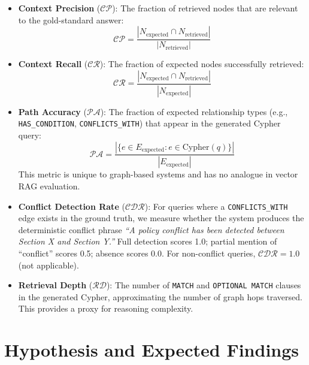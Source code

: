 \begin{itemize}
    \item \textbf{Context Precision} ($\mathcal{CP}$): The fraction of retrieved nodes that are relevant to the gold-standard answer:
    \begin{equation}
        \mathcal{CP} = \frac{|N_{\text{expected}} \cap N_{\text{retrieved}}|}{|N_{\text{retrieved}}|}
    \end{equation}

    \item \textbf{Context Recall} ($\mathcal{CR}$): The fraction of expected nodes successfully retrieved:
    \begin{equation}
        \mathcal{CR} = \frac{|N_{\text{expected}} \cap N_{\text{retrieved}}|}{|N_{\text{expected}}|}
    \end{equation}

    \item \textbf{Path Accuracy} ($\mathcal{PA}$): The fraction of expected relationship types (e.g., \texttt{HAS\_CONDITION}, \texttt{CONFLICTS\_WITH}) that appear in the generated Cypher query:
    \begin{equation}
        \mathcal{PA} = \frac{|\{e \in E_{\text{expected}} : e \in \text{Cypher}(q)\}|}{|E_{\text{expected}}|}
    \end{equation}
    This metric is unique to graph-based systems and has no analogue in vector RAG evaluation.

    \item \textbf{Conflict Detection Rate} ($\mathcal{CDR}$): For queries where a \texttt{CONFLICTS\_WITH} edge exists in the ground truth, we measure whether the system produces the deterministic conflict phrase \textit{``A policy conflict has been detected between Section X and Section Y.''}  Full detection scores 1.0; partial mention of ``conflict'' scores 0.5; absence scores 0.0. For non-conflict queries, $\mathcal{CDR} = 1.0$ (not applicable).

    \item \textbf{Retrieval Depth} ($\mathcal{RD}$): The number of \texttt{MATCH} and \texttt{OPTIONAL MATCH} clauses in the generated Cypher, approximating the number of graph hops traversed. This provides a proxy for reasoning complexity.
\end{itemize}


\section{Hypothesis and Expected Findings}
\label{sec:hypothesis}

